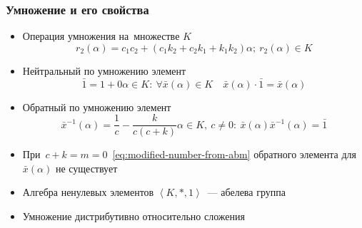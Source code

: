 \documentclass[12pt]{beamer}
\begin{document}
\begin{frame}
  \frametitle{Умножение и его свойства}
  \begin{itemize}
    \item Операция умножения на~множестве $K$
      \begin{equation}
      \label{eq:fuzzy-multiplication}
        r_2\left( \alpha \right)=c_1 c_2+\left(c_1 k_2+ c_2 k_1 +k_1 k_2 \right)\alpha;\ r_2\left( \alpha  \right)\in K
      \end{equation}
    \item Нейтральный по умножению элемент
      \begin{equation}
        \label{eq:fuzzy-one}
        \bar{1}=1+0\alpha \in K:\ \forall \bar{x}\left( \alpha  \right)\in K\quad \bar{x}\left( \alpha  \right)\cdot \bar{1}=\bar{x}\left( \alpha  \right)
      \end{equation}
    \item Обратный по умножению элемент
      \begin{equation}
        \label{eq:fuzzy-division}
        \bar{x}^{-1}(\alpha )=\frac{1}{c}-\frac{k}{c\left(c+k\right)}\alpha \in K,\ c\ne 0:\ \bar{x}\left(\alpha \right){{\bar{x}}^{-1}}\left( \alpha  \right)=\bar{1}
      \end{equation}
    \item При~$c+k=m=0$~\eqref{eq:modified-number-from-abm} обратного элемента для $\bar{x}\left( \alpha  \right)$ не существует
    \item Алгебра ненулевых элементов $\left \langle K,*,1 \right \rangle$~--- абелева группа
    \item Умножение дистрибутивно относительно сложения
  \end{itemize}
\end{frame}

\end{document}

